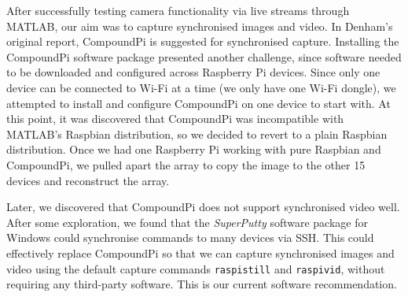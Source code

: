 \documentclass[../main.tex]{subfiles}
\begin{document}
After successfully testing camera functionality via live streams through MATLAB, our aim was to capture synchronised images and video. In Denham's original report, CompoundPi is suggested for synchronised capture. Installing the CompoundPi software package presented another challenge, since software needed to be downloaded and configured across Raspberry Pi devices. Since only one device can be connected to Wi-Fi at a time (we only have one Wi-Fi dongle), we attempted to install and configure CompoundPi on one device to start with. At this point, it was discovered that CompoundPi was incompatible with MATLAB's Raspbian distribution, so we decided to revert to a plain Raspbian distribution. Once we had one Raspberry Pi working with pure Raspbian and CompoundPi, we pulled apart the array to copy the image to the other 15 devices and reconstruct the array.

Later, we discovered that CompoundPi does not support synchronised video well. After some exploration, we found that the \emph{SuperPutty} software package for Windows could synchronise commands to many devices via SSH. This could effectively replace CompoundPi so that we can capture synchronised images and video using the default capture commands \texttt{raspistill} and \texttt{raspivid}, without requiring any third-party software. This is our current software recommendation.
\end{document}
